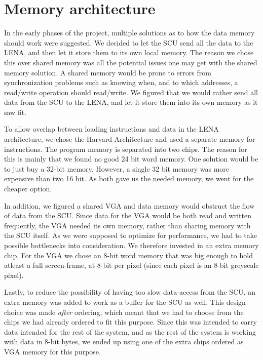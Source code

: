 \section {Memory architecture}
 In the early phases of the project,
multiple solutions as to how the data memory should work were suggested. We
decided to let the \ac{SCU} send all the data to the \ac{LENA}, and then let it store
them to its own local memory. The reason we chose this over shared memory was
all the potential issues one may get with the shared memory solution. A shared memory
would be prone to errors from synchronization problems such as knowing when,
and to which addresses, a read/write operation should read/write. We figured
that we would rather send all data from the \ac{SCU} to the \ac{LENA}, and let it
store them into its own memory as it saw fit.

To allow overlap between loading instructions and data in the LENA
architecture, we chose the Harvard Architecture and used a separate memory for
instructions. The program memory is
separated into two chips. The reason for this is mainly that we found no good 24
bit word memory. One solution would be to just buy a 32-bit memory. However, a single 32
bit memory was more expensive than two 16 bit. As both gave us the needed memory,
we went for the cheaper option.

 In addition, we figured a shared \ac{VGA} and data memory would obstruct the flow
of data from the \ac{SCU}. Since data for the \ac{VGA} would be both read and written
frequently, the \ac{VGA} needed its own memory, rather than sharing memory with
the SCU itself. As we were supposed to optimize for performance, we had to take
possible bottlenecks into consideration. We therefore invested in an extra
memory chip. For the VGA we chose an 8-bit word memory that was big enough to
hold atleast a full screen-frame, at 8-bit per pixel (since each pixel is an 8-bit greyscale pixel).

Lastly, to reduce the possibility of having too slow data-access from the SCU, an extra memory was added to work as
a buffer for the SCU as well. This design choice was made {\em after} ordering, which meant that we had to choose from
the chips we had already ordered to fit this purpose. Since this was intended to carry data intended for the rest
of the system, and as the rest of the system is working with data in 8-bit bytes, we ended up using one of the
extra chips ordered as \ac{VGA} memory for this purpose.

